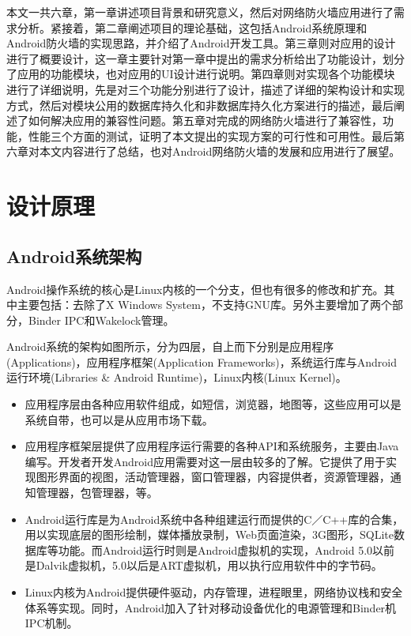 \documentclass[format=final, language=chinese, degree=fyp]{hustthesis}
\begin{document}
本文一共六章，第一章讲述项目背景和研究意义，然后对网络防火墙应用进行了需求分析。紧接着，第二章阐述项目的理论基础，这包括Android系统原理和Android防火墙的实现思路，并介绍了Android开发工具。第三章则对应用的设计进行了概要设计，这一章主要针对第一章中提出的需求分析给出了功能设计，划分了应用的功能模块，也对应用的UI设计进行说明。第四章则对实现各个功能模块进行了详细说明，先是对三个功能分别进行了设计，描述了详细的架构设计和实现方式，然后对模块公用的数据库持久化和非数据库持久化方案进行的描述，最后阐述了如何解决应用的兼容性问题。第五章对完成的网络防火墙进行了兼容性，功能，性能三个方面的测试，证明了本文提出的实现方案的可行性和可用性。最后第六章对本文内容进行了总结，也对Android网络防火墙的发展和应用进行了展望。

\chapter{设计原理}\label{chapter:3}

\section{Android系统架构}

Android操作系统的核心是Linux内核的一个分支，但也有很多的修改和扩充。其中主要包括：去除了X Windows System，不支持GNU库。另外主要增加了两个部分，Binder IPC和Wakelock管理。

Android系统的架构如图所示，分为四层，自上而下分别是应用程序(Applications)，应用程序框架(Application Frameworks)，系统运行库与Android运行环境(Libraries \& Android Runtime)，Linux内核(Linux Kernel)。
\begin{itemize}
	\item 应用程序层由各种应用软件组成，如短信，浏览器，地图等，这些应用可以是系统自带，也可以是从应用市场下载。
	\item 应用程序框架层提供了应用程序运行需要的各种API和系统服务，主要由Java编写。开发者开发Android应用需要对这一层由较多的了解。它提供了用于实现图形界面的视图，活动管理器，窗口管理器，内容提供者，资源管理器，通知管理器，包管理器，等。
	\item Android运行库是为Android系统中各种组建运行而提供的C／C++库的合集，用以实现底层的图形绘制，媒体播放录制，Web页面渲染，3G图形，SQLite数据库等功能。而Android运行时则是Android虚拟机的实现，Android 5.0以前是Dalvik虚拟机，5.0以后是ART虚拟机，用以执行应用软件中的字节码。
	\item Linux内核为Android提供硬件驱动，内存管理，进程眼里，网络协议栈和安全体系等实现。同时，Android加入了针对移动设备优化的电源管理和Binder机IPC机制。
\end{itemize}
\end{document}
